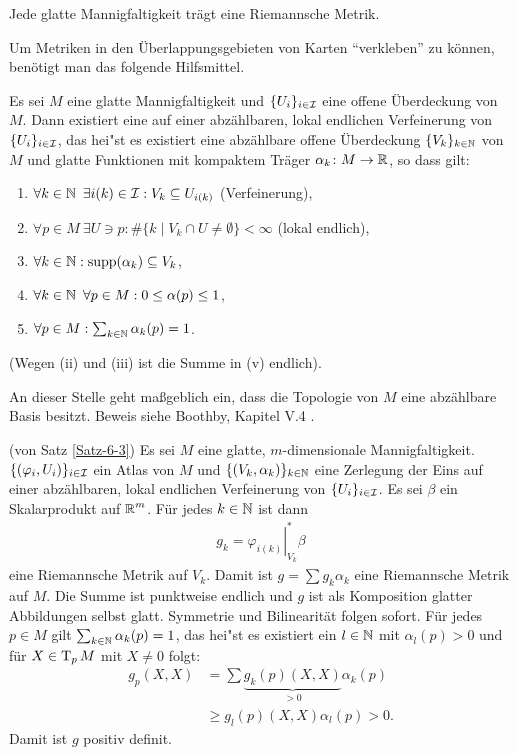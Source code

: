 \begin{Satz}\label{Satz-6-3}
  Jede glatte Mannigfaltigkeit trägt eine Riemannsche Metrik.
\end{Satz}

Um Metriken in den Überlappungsgebieten von Karten "`verkleben"' zu können, benötigt man das folgende Hilfsmittel.

\begin{satz}
  Es sei $M$ eine glatte Mannigfaltigkeit und $\{U_i\}_{i \in \operatorname{\mathcal{I}}}$ eine offene Überdeckung von $M$.
  Dann existiert eine  auf einer abzählbaren, lokal endlichen Verfeinerung von $\{U_i\}_{i \in \operatorname{\mathcal{I}}}$, das hei"st es existiert eine abzählbare offene Überdeckung $\{V_k\}_{k\in\operatorname{\mathbb{N}}}$ von $M$ und glatte Funktionen mit kompaktem Träger $\alpha_k \colon M \to \operatorname{\mathbb{R}}$, so dass gilt:

  \begin{enumerate}[label=(\roman*)]
  \item $\forall k \in \operatorname{\mathbb{N}} \ \exists i(k) \in \operatorname{\mathcal{I}}: V_k \subseteq U_{i(k)}$ (Verfeinerung),
  \item $\forall p \in M \ \exists U \ni p: \# \{k \mid V_k \cap U \neq \emptyset \} < \infty$ (lokal endlich),
  \item $\forall k \in \operatorname{\mathbb{N}}: \operatorname{supp} (\alpha_k) \subseteq V_k$,
  \item $\forall k \in \operatorname{\mathbb{N}} \ \forall p \in M: 0 \leq \alpha(p) \leq 1$,
  \item $\forall p \in M: \sum_{k\in\operatorname{\mathbb{N}}}\alpha_k(p) = 1$.
  \end{enumerate}
  (Wegen (ii) und (iii) ist die Summe in (v) endlich).
\end{satz}
An dieser Stelle geht maßgeblich ein, dass die Topologie von $M$ eine abzählbare Basis besitzt. Beweis siehe Boothby, Kapitel V.4 \cite{boothby1986introduction}.

\begin{bew}(von Satz \ref{Satz-6-3})
Es sei $M$ eine glatte, $m$-dimensionale Mannigfaltigkeit. $\{(\varphi_i,U_i)\}_{i \in \operatorname{\mathcal{I}}}$ ein Atlas von $M$ und $\{(V_k,\alpha_k)\}_{k \in \operatorname{\mathbb{N}}}$ eine Zerlegung der Eins auf einer abzählbaren, lokal endlichen Verfeinerung von $\{U_i\}_{i \in \operatorname{\mathcal{I}}}$. Es sei $\beta$ ein Skalarprodukt auf $\operatorname{\mathbb{R}}^m$. Für jedes $k \in \operatorname{\mathbb{N}}$ ist dann
\begin{align*}
	g_k = \left.\varphi_{i(k)}\right|_{V_k}^{*}\beta
\end{align*}
eine Riemannsche Metrik auf $V_k$. Damit ist $g = \sum g_k\alpha_k$ eine Riemannsche Metrik auf $M$.
Die Summe ist punktweise endlich und $g$ ist als Komposition glatter Abbildungen selbst glatt.
Symmetrie und Bilinearität folgen sofort.
Für jedes $p \in M$ gilt $\sum_{k \in \operatorname{\mathbb{N}}}\alpha_k(p) = 1$, das hei"st es existiert ein $l \in \operatorname{\mathbb{N}}$ mit $\alpha_l(p) > 0$ und für $X \in \operatorname{T}_pM$ mit $X \neq 0$ folgt:
\begin{align*}
	g_p(X,X) & = \sum \underbrace{g_k(p)(X,X)}_{> 0}\alpha_k(p)\\
	& \geq g_l(p)(X,X)\alpha_l(p) > 0.
\end{align*}
Damit ist $g$ positiv definit.
\end{bew}

